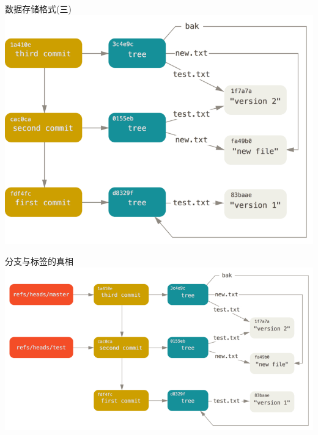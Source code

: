 \begin{frame}{数据存储格式(三)}
    \centering
    \includegraphics[scale=0.32]{figures/data-model-3.png}
\end{frame}

\begin{frame}{分支与标签的真相}
    \centering
    \includegraphics[scale=0.40]{figures/data-model-4.png}
\end{frame}
